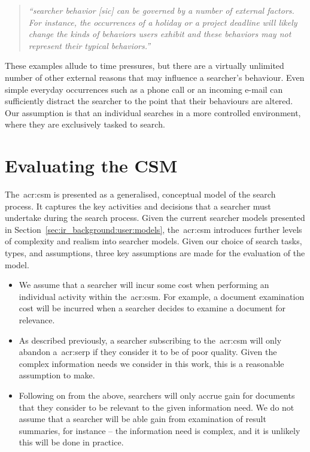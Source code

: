 \begin{quote}
    \emph{``searcher behavior [sic] can be governed by a number of external factors. For instance, the occurrences of a holiday or a project deadline will likely change the kinds of behaviors users exhibit and these behaviors may not represent their typical behaviors.''}
\end{quote}

These examples allude to time pressures, but there are a virtually unlimited number of other external reasons that may influence a searcher's behaviour. Even simple everyday occurrences such as a phone call or an incoming e-mail can sufficiently distract the searcher to the point that their behaviours are altered. Our assumption is that an individual searches in a more controlled environment, where they are exclusively tasked to search.

\section{Evaluating the CSM}\label{sec:csm:evaluation}
The~\gls{acr:csm} is presented as a generalised, conceptual model of the search process. It captures the key activities and decisions that a searcher must undertake during the search process. Given the current searcher models presented in Section~\ref{sec:ir_background:user:models}, the~\gls{acr:csm} introduces further levels of complexity and realism into searcher models. Given our choice of search tasks, types, and assumptions, three key assumptions are made for the evaluation of the model.

\begin{itemize}
    \item{ We assume that a searcher will incur some cost when performing an individual activity within the~\gls{acr:csm}. For example, a document examination cost will be incurred when a searcher decides to examine a document for relevance.}
    \item{ As described previously, a searcher subscribing to the~\gls{acr:csm} will only abandon a~\gls{acr:serp} if they consider it to be of poor quality. Given the complex information needs we consider in this work, this is a reasonable assumption to make.}
    \item{ Following on from the above, searchers will only accrue gain for documents that they consider to be relevant to the given information need. We do not assume that a searcher will be able gain from examination of result summaries, for instance -- the information need is complex, and it is unlikely this will be done in practice.}
\end{itemize}

